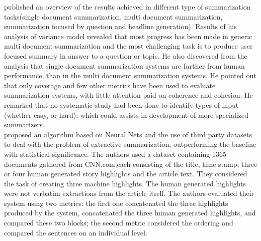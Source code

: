  published an overview of the results achieved in different type of summarization tasks(single document summarization, multi document summarization,
summarization focused by question and headline generation). Results of his analysis of variance model revealed that most progress has been made in generic multi document
summarization and the most challenging task is to produce user focused summary in answer to a question or topic. He also discovered from the analysis that single document
summarization systems are further from human performance, than in the multi document summarization systems. He pointed out that only coverage and few other metrics have 
been used to evaluate summarization systems, with little attention paid on coherence and cohesion. He remarked that no systematic study had been done to identify types 
of input (whether easy, or hard); which could assists in development of more specialized summarizers.\\

 proposed an algorithm based on Neural Nets and the use of third party datasets to deal with the problem of extractive summarization, outperforming 
the baseline with statistical significance. The authors used a dataset containing 1365 documents gathered from CNN.com,each consisting of the title, time stamp, three or 
four human generated story highlights and the article text. They considered the task of creating three machine highlights. The human generated highlights were not 
verbatim extractions from the article itself. The authors evaluated their system using two metrics: the first one concatenated the three highlights produced by the system,
concatenated the three human generated highlights, and compared these two blocks; the second metric considered the ordering and compared the sentences on an individual 
level.\\

